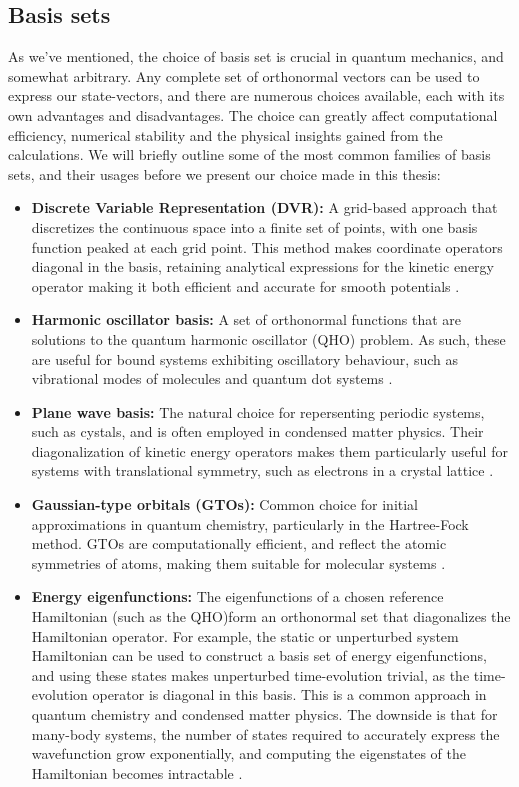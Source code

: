 \documentclass{subfiles}
\begin{document}
\subsection{Basis sets}\label{sec:basis_set}
As we've mentioned, the choice of basis set is crucial in quantum mechanics, and somewhat arbitrary. Any complete set of orthonormal vectors can be used to express our state-vectors, and there are numerous choices available, each with its own advantages and disadvantages. The choice can greatly affect computational efficiency, numerical stability and the physical insights gained from the calculations. We will briefly outline some of the most common families of basis sets, and their usages before we present our choice made in this thesis:
\begin{itemize}
    \item \textbf{Discrete Variable Representation (DVR):} A grid-based approach that discretizes the continuous space into a finite set of points, with one basis function peaked at each grid point. This method makes coordinate operators diagonal in the basis, retaining analytical expressions for the kinetic energy operator making it both efficient and accurate for smooth potentials \cite{light1985generalized}. 
    \item \textbf{Harmonic oscillator basis:} A set of orthonormal functions that are solutions to the quantum harmonic oscillator (QHO) problem. As such, these are useful for bound systems exhibiting oscillatory behaviour, such as vibrational modes of molecules and quantum dot systems \cite{helgaker2013molecular}.
    \item \textbf{Plane wave basis:} The natural choice for repersenting periodic systems, such as cystals, and is often employed in condensed matter physics. Their diagonalization of kinetic energy operators makes them particularly useful for systems with translational symmetry, such as electrons in a crystal lattice \cite{kittel2018introduction}.
    \item \textbf{Gaussian-type orbitals (GTOs):} Common choice for initial approximations in quantum chemistry, particularly in the Hartree-Fock method. GTOs are computationally efficient, and reflect the atomic symmetries of atoms, making them suitable for molecular systems \cite{szabo1996modern}.
    \item \textbf{Energy eigenfunctions:} The eigenfunctions of a chosen reference Hamiltonian (such as the QHO)form an orthonormal set that diagonalizes the Hamiltonian operator. For example, the static or unperturbed system Hamiltonian can be used to construct a basis set of energy eigenfunctions, and using these states makes unperturbed time-evolution trivial, as the time-evolution operator is diagonal in this basis. This is a common approach in quantum chemistry and condensed matter physics. The downside is that for many-body systems, the number of states required to accurately express the wavefunction grow exponentially, and computing the eigenstates of the Hamiltonian becomes intractable \cite{helgaker2013molecular, szabo1996modern}.
\end{itemize}
\end{document}
